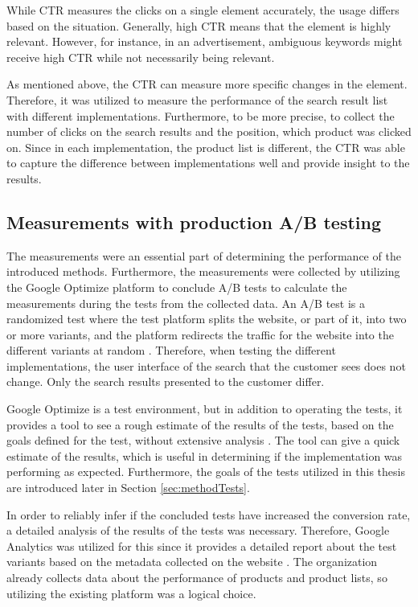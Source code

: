 While CTR measures the clicks on a single element accurately, the usage differs based on the situation.
Generally, high CTR means that the element is highly relevant. 
However, for instance, in an advertisement, ambiguous keywords might receive high CTR while not necessarily being relevant.
\cite{ctrWhat}

As mentioned above, the CTR can measure more specific changes in the element. 
Therefore, it was utilized to measure the performance of the search result list with different implementations.
Furthermore, to be more precise, to collect the number of clicks on the search results and the position, which product
was clicked on.
Since in each implementation, the product list is different, the CTR was able to capture the 
difference between implementations well and provide insight to the results.

\subsection{Measurements with production A/B testing}
\label{ss:abtest}

The measurements were an essential part of determining the performance of the introduced methods.
Furthermore, the measurements were collected by utilizing the Google Optimize platform to conclude A/B tests
to calculate the measurements during the tests from the collected data.
An A/B test is a randomized test where the test platform splits the website, or part of it, into two or more variants, 
and the platform redirects the traffic for the website into the different variants at random \cite{optimizeAbout}. 
Therefore, when testing the different implementations, the user interface of the search that the customer sees does not change. 
Only the search results presented to the customer differ.


Google Optimize is a test environment, but in addition to operating the tests, 
it provides a tool to see a rough estimate of the results of the tests, 
based on the goals defined for the test, without extensive analysis \cite{optimizeAbout}. 
The tool can give a quick estimate of the results,
which is useful in determining if the implementation was performing as expected. 
Furthermore, the goals of the tests utilized 
in this thesis are introduced later in Section \ref{sec:methodTests}.


In order to reliably infer if the concluded tests have increased the conversion rate, 
a detailed analysis of the results of the tests was necessary. 
Therefore, Google Analytics was utilized for this since it 
provides a detailed report about the test variants based on the metadata collected on the website
\cite{analyticsAbout}.
The organization already collects data about the performance of products and product lists, 
so utilizing the existing platform was a logical choice.


